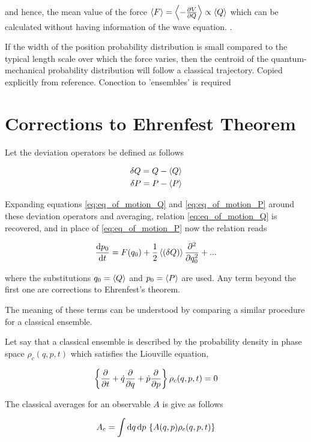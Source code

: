and hence, the mean value of the force $\left\langle F \right\rangle = \left\langle -\frac{\partial V}{\partial Q} \right\rangle \propto \left\langle Q \right\rangle$ which can be calculated without having information of the wave equation. \cite{manfrediQuantumSystemsThat1993}.


If the width of the position probability distribution is small compared to the typical length scale over which the force varies, then the centroid of the quantum-mechanical probability distribution will follow a classical trajectory. \alert{Copied explicitly from reference. Conection to 'ensembles' is required}


\section{Corrections to Ehrenfest Theorem}

\label{sec:Ehrenfest_corrections}
Let the deviation operators be defined as follows

\begin{align}
    \delta Q = Q - \left\langle Q \right\rangle\\
    \delta P = P - \left\langle P \right\rangle
\end{align}

Expanding equations \eqref{eq:eq_of_motion_Q} and \eqref{eq:eq_of_motion_P} around these deviation operators and averaging, relation \eqref{eq:eq_of_motion_Q} is recovered, and in place of \eqref{eq:eq_of_motion_P} now the relation reads

\begin{equation}
    \frac{\text d p_0}{\text d t} = F(q_0) + \dfrac{1}{2}\left\langle (\delta Q) \right\rangle\frac{\partial ^2}{\partial q_0^2} + ...
\end{equation}

where the substitutions $q_0 = \left\langle Q \right\rangle$ and $p_0 = \left\langle P \right\rangle$ are used. Any term beyond the first one are corrections to Ehrenfest's theorem.

The meaning of these terms can be understood by comparing a similar procedure for a classical ensemble.

Let say that a classical ensemble is described by the probability density in phase space $\rho_c(q, p, t)$ which satisfies the Liouville equation,

\begin{equation}
    \left\{\frac{\partial }{\partial t} + \dot q \frac{\partial }{\partial q} + \dot p \frac{\partial }{\partial p}\right\}\rho_c(q, p, t) = 0
\end{equation}

The classical averages for an observable $A$ is give as follows

\begin{equation}
    A_c = \int \text d{q}\,\text d{p} \,\left\{A(q,p)\rho_c(q, p, t)\right \}
\end{equation}


